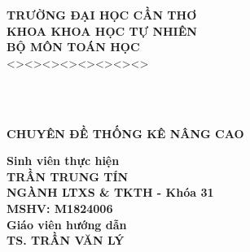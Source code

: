 \documentclass[a4paper,oneside]{../../styles/thesis}
\begin{document}
\newpage


\begin{titlepage}

\hspace{2.8cm} {\bf \fontsize{16pt}{16}\selectfont TRƯỜNG ĐẠI HỌC CẦN THƠ}\\
\vspace*{0.05cm}
\hspace{3.3cm} {\bf\fontsize{16pt}{16}\selectfont KHOA KHOA HỌC TỰ NHIÊN}\\
 \vspace*{0.05cm}
\hspace{4.3cm} {\bf\fontsize{16pt}{16}\selectfont BỘ MÔN TOÁN HỌC}\\
\vspace*{0.05cm}
\hspace{5 cm} <><><><><><><><> 


\vspace*{2cm}

\\
 \vspace*{0.05cm}\\
\vspace*{2cm}

\begin{center}
 {\bf\fontsize{20pt}{28}\selectfont CHUYÊN ĐỀ THỐNG KÊ NÂNG CAO }   
\end{center}




\vspace*{1.5cm}

\begin{center}
\textbf{Sinh viên thực hiện}\\    
\textbf{TRẦN TRUNG TÍN}\\
\textbf{NGÀNH LTXS \& TKTH - Khóa 31}\\
\textbf{MSHV: M1824006}\\
\vspace{1cm}
\textbf{Giáo viên hướng dẫn}\\
\textbf{TS. TRẦN VĂN LÝ}
\end{center}



\vspace*{3cm}
\end{titlepage}
\end{document}
